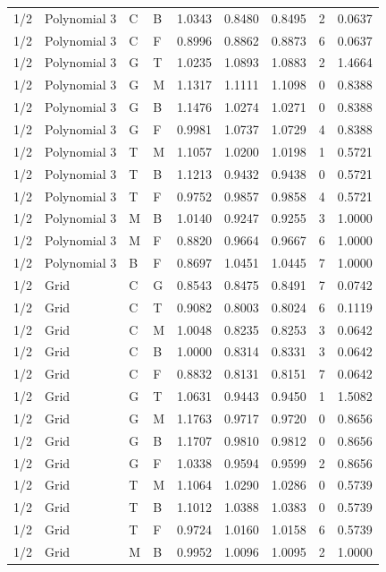\begin{longtable}{llllrrrrr}
1/2 & Polynomial 3 & C & B & 1.0343 & 0.8480 & 0.8495 & 2 & 0.0637 \\
1/2 & Polynomial 3 & C & F & 0.8996 & 0.8862 & 0.8873 & 6 & 0.0637 \\
1/2 & Polynomial 3 & G & T & 1.0235 & 1.0893 & 1.0883 & 2 & 1.4664 \\
1/2 & Polynomial 3 & G & M & 1.1317 & 1.1111 & 1.1098 & 0 & 0.8388 \\
1/2 & Polynomial 3 & G & B & 1.1476 & 1.0274 & 1.0271 & 0 & 0.8388 \\
1/2 & Polynomial 3 & G & F & 0.9981 & 1.0737 & 1.0729 & 4 & 0.8388 \\
1/2 & Polynomial 3 & T & M & 1.1057 & 1.0200 & 1.0198 & 1 & 0.5721 \\
1/2 & Polynomial 3 & T & B & 1.1213 & 0.9432 & 0.9438 & 0 & 0.5721 \\
1/2 & Polynomial 3 & T & F & 0.9752 & 0.9857 & 0.9858 & 4 & 0.5721 \\
1/2 & Polynomial 3 & M & B & 1.0140 & 0.9247 & 0.9255 & 3 & 1.0000 \\
1/2 & Polynomial 3 & M & F & 0.8820 & 0.9664 & 0.9667 & 6 & 1.0000 \\
1/2 & Polynomial 3 & B & F & 0.8697 & 1.0451 & 1.0445 & 7 & 1.0000 \\
1/2 & Grid & C & G & 0.8543 & 0.8475 & 0.8491 & 7 & 0.0742 \\
1/2 & Grid & C & T & 0.9082 & 0.8003 & 0.8024 & 6 & 0.1119 \\
1/2 & Grid & C & M & 1.0048 & 0.8235 & 0.8253 & 3 & 0.0642 \\
1/2 & Grid & C & B & 1.0000 & 0.8314 & 0.8331 & 3 & 0.0642 \\
1/2 & Grid & C & F & 0.8832 & 0.8131 & 0.8151 & 7 & 0.0642 \\
1/2 & Grid & G & T & 1.0631 & 0.9443 & 0.9450 & 1 & 1.5082 \\
1/2 & Grid & G & M & 1.1763 & 0.9717 & 0.9720 & 0 & 0.8656 \\
1/2 & Grid & G & B & 1.1707 & 0.9810 & 0.9812 & 0 & 0.8656 \\
1/2 & Grid & G & F & 1.0338 & 0.9594 & 0.9599 & 2 & 0.8656 \\
1/2 & Grid & T & M & 1.1064 & 1.0290 & 1.0286 & 0 & 0.5739 \\
1/2 & Grid & T & B & 1.1012 & 1.0388 & 1.0383 & 0 & 0.5739 \\
1/2 & Grid & T & F & 0.9724 & 1.0160 & 1.0158 & 6 & 0.5739 \\
1/2 & Grid & M & B & 0.9952 & 1.0096 & 1.0095 & 2 & 1.0000 \\

\end{longtable}

